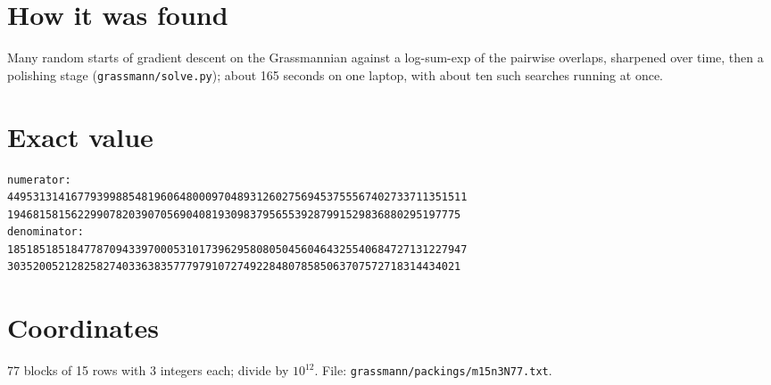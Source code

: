 \documentclass[11pt,a4paper]{article}
\begin{document}
\section{How it was found}
Many random starts of gradient descent on the Grassmannian against a log-sum-exp of the pairwise overlaps, sharpened over time, then a polishing stage (\texttt{grassmann/solve.py}); about 165 seconds on one laptop, with about ten such searches running at once.


\appendix
\section{Exact value}
{\small
\begin{verbatim}
numerator:
449531314167793998854819606480009704893126027569453755567402733711351511
19468158156229907820390705690408193098379565539287991529836880295197775
denominator:
185185185184778709433970005310173962958080504560464325540684727131227947
30352005212825827403363835777979107274922848078585063707572718314434021
\end{verbatim}}

\section{Coordinates}
77 blocks of 15 rows with 3 integers each; divide by $10^{12}$. File: \texttt{grassmann/packings/m15n3N77.txt}.
{\tiny
\begin{multicols}{3}
\end{multicols}}
\end{document}

